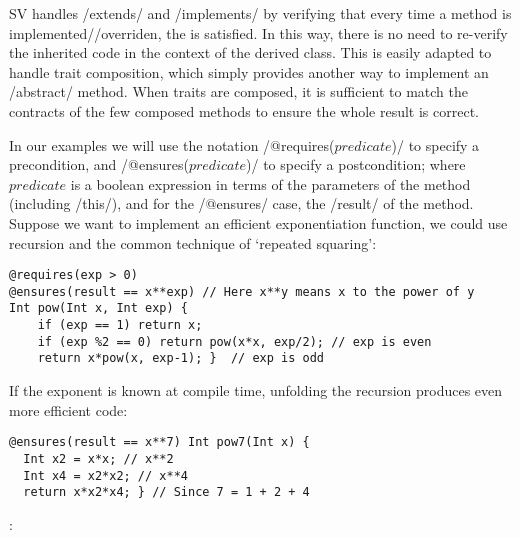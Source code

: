 SV handles /extends/ and /implements/ by verifying that every 
time a method is implemented//overriden, 
the  is satisfied. In this way, there is no need to re-verify
the inherited code in the context of the derived class.
This is easily adapted
to handle trait composition, which simply provides another way to implement an /abstract/ method.
When traits are composed,
it is sufficient
to match the contracts of the few composed methods
to ensure the whole result is correct.

In our examples we will use the notation /@requires($predicate$)/ 
to specify a precondition, and /@ensures($predicate$)/ 
to specify a postcondition; where $predicate$ is a boolean expression
in terms of the parameters of the method (including /this/), and for the /@ensures/ case, the /result/ of the method.
Suppose we want to implement an efficient exponentiation function, we could use recursion and the common technique of `repeated squaring':
\vspace{-1ex}
\begin{lstlisting}
@requires(exp > 0)
@ensures(result == x**exp) // Here x**y means x to the power of y
Int pow(Int x, Int exp) {
	if (exp == 1) return x;
	if (exp %2 == 0) return pow(x*x, exp/2); // exp is even
	return x*pow(x, exp-1); }  // exp is odd
\end{lstlisting}
If the exponent is known at compile time,
unfolding the recursion produces even more efficient code:
\vspace{-1ex}
\begin{lstlisting}[firstnumber=7]
@ensures(result == x**7) Int pow7(Int x) { 
  Int x2 = x*x; // x**2
  Int x4 = x2*x2; // x**4
  return x*x2*x4; } // Since 7 = 1 + 2 + 4
\end{lstlisting}
\vspace{-1ex}
:
